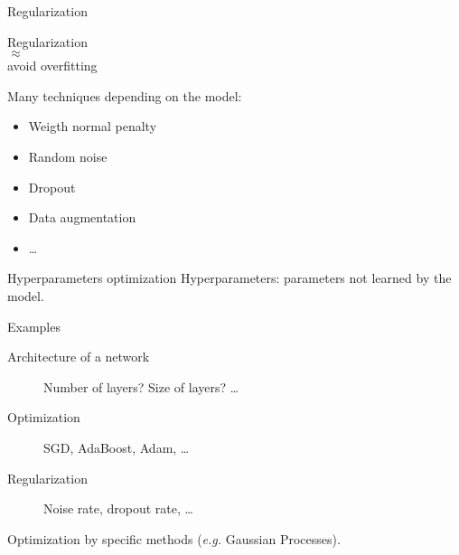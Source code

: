 \begin{frame}{Regularization}
  \begin{minipage}[l]{0.49\linewidth}
    \begin{center}
      Regularization \\
      $\approx$\\
      avoid overfitting
    \end{center}
  \end{minipage}\hfill
  \begin{minipage}[l]{0.49\linewidth}
  \end{minipage}\hfill
  Many techniques depending on the model:
  \begin{itemize}
  \item Weigth normal penalty
  \item Random noise
  \item Dropout
  \item Data augmentation
  \item …
  \end{itemize}
\end{frame}

\begin{frame}{Hyperparameters optimization}
  Hyperparameters: parameters \alert{not learned} by the model.
  \begin{exampleblock}{Examples}
  \begin{description}
  \item[Architecture of a network] Number of layers? Size of layers? …
  \item[Optimization] SGD, AdaBoost, Adam, …
  \item[Regularization] Noise rate, dropout rate, …
  \end{description}
  \end{exampleblock}
  Optimization by specific methods (\emph{e.g.} Gaussian Processes).
\end{frame}

